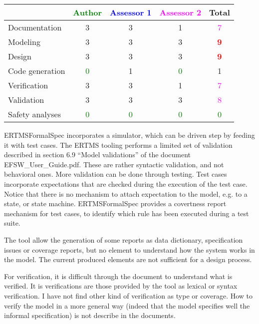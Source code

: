 \begin{tabular}{|l | c | c | c | c|}
\hline
& \textcolor{green}{Author} & \textcolor{blue}{Assessor 1} & \textcolor{magenta}{Assessor 2} & Total \\
\hline 
Documentation & 3     & 3     & 1     & \textcolor{magenta}{7} \\
\hline
Modeling & 3     & 3     & 3     & \textcolor{red}{\textbf{9}} \\
\hline
Design & 3     & 3     & 3     & \textcolor{red}{\textbf{9}} \\
\hline
Code generation & \textcolor{green}{0} & 1     & \textcolor{green}{0} & 1    \\
\hline
Verification & 3     & 3     & 1     & \textcolor{magenta}{7} \\
\hline
Validation & 3     & 3     & 3     & \textcolor{magenta}{8} \\
\hline
Safety analyses & \textcolor{green}{0} & \textcolor{green}{0} & \textcolor{green}{0} & \textcolor{green}{0} \\
\hline
\end{tabular}

\begin{assessor1}
ERTMSFormalSpec incorporates a simulator, which can be driven step by feeding it with test cases. 
The ERTMS tooling performs a limited set of validation described in section 6.9 "`Model validations"' of the document EFSW\_User\_Guide.pdf. These are rather syntactic validation, and not behavioral ones. More validation can be done through testing. Test cases incorporate expectations that are checked during the execution of the test case. Notice that there is no mechanism to attach expectation to the model, e.g. to a state, or state machine. ERTMSFormalSpec provides a covertness report mechanism for test cases, to identify which rule has been executed during a test suite. 
\end{assessor1}

\begin{assessor2}
The tool allow the generation of some reports as data dictionary, specification issues or coverage reports, but no element to understand how the system works in the model. The current produced elements are not sufficient for a design process.

For verification, it is difficult through the document to understand what is verified. It is verifications are those provided by the tool as lexical or syntax verification. I have not find other kind of verification as type or coverage. How to verify the model in a more general way (indeed that the model specifies well the informal specification) is not describe in the documents.
\end{assessor2}


